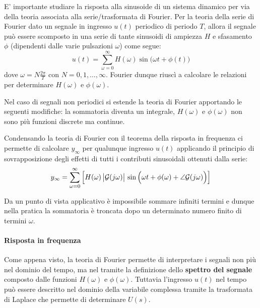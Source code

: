 		\vspace{3mm}
		
		E' importante studiare la risposta alla sinusoide di un sistema dinamico per via della teoria associata alla serie/trasformata di Fourier. Per la teoria della serie di Fourier dato un segnale in ingresso $u(t)$ periodico di periodo $T$, allora il segnale può essere scomposto in una serie di tante sinusoidi di ampiezza $H$ e sfasamento $\phi$ (dipendenti dalle varie pulsazioni $\omega$) come segue:
		\begin{equation}
			u(t) = \sum_{\omega = 0}^\infty H(\omega) \sin \big(\omega t + \phi(t)\big)
		\end{equation}
		dove $\omega = N \frac {2\pi} T$ con $N=0,1,\dots, \infty$. Fourier dunque riuscì a calcolare le relazioni per determinare $H(\omega)$ e $\phi(\omega)$.
		
		Nel caso di segnali non periodici si estende la teoria di Fourier apportando le seguenti modifiche: la sommatoria diventa un integrale, $H(\omega)$ e $\phi(\omega)$ non sono più funzioni discrete ma continue.
		
		Condensando la teoria di Fourier con il teorema della risposta in frequenza ci permette di calcolare $y_\infty$ per qualunque ingresso $u(t)$ applicando il principio di sovrapposizione degli effetti di tutti i contributi sinusoidali ottenuti dalla serie:
		\begin{equation}
			y_\infty = \sum_{\omega = 0}^\infty \Big[ H(\omega) \, \big|\mathcal G(j\omega)\big| \, \sin\Big(  \omega t + \phi(\omega) + \angle \mathcal G(j\omega) \Big)  \Big]
		\end{equation}
		
		Da un punto di vista applicativo è impossibile sommare infiniti termini e dunque nella pratica la sommatoria è troncata dopo un determinato numero finito di termini $\omega$.
		
		\paragraph{Risposta in frequenza} Come appena visto, la teoria di Fourier permette di interpretare i segnali non più nel dominio del tempo, ma nel  tramite la definizione dello \textbf{spettro del segnale} composto dalle funzioni $H(\omega)$ e $\phi(\omega)$. Tuttavia l'ingresso $u(t)$ nel tempo può essere descritto nel dominio della variabile complessa tramite la trasformata di Laplace che permette di determinare $U(s)$.
		
